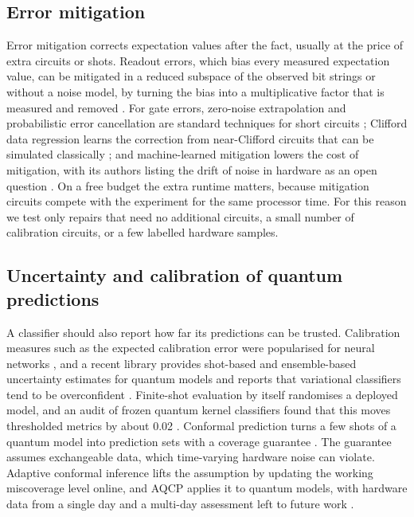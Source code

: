 \subsection{Error mitigation}
Error mitigation corrects expectation values after the fact, usually at the price of extra
circuits or shots. Readout errors, which bias every measured expectation value, can be mitigated
in a reduced subspace of the observed bit strings \cite{nation2021m3} or without a noise model,
by turning the bias into a multiplicative factor that is measured and removed
\cite{vandenberg2022trex}. For gate errors, zero-noise extrapolation and probabilistic error
cancellation are standard techniques for short circuits \cite{temme2017zne}; Clifford data
regression learns the correction from near-Clifford circuits that can be simulated classically
\cite{czarnik2021cdr}; and machine-learned mitigation lowers the cost of mitigation, with its
authors listing the drift of noise in hardware as an open question \cite{liao2024mlqem}. On a
free budget the extra runtime matters, because mitigation circuits compete with the experiment
for the same processor time. For this reason we test only repairs that need no additional
circuits, a small number of calibration circuits, or a few labelled hardware samples.

\subsection{Uncertainty and calibration of quantum predictions}
A classifier should also report how far its predictions can be trusted. Calibration measures such
as the expected calibration error were popularised for neural networks \cite{guo2017calibration},
and a recent library provides shot-based and ensemble-based uncertainty estimates for quantum
models and reports that variational classifiers tend to be overconfident \cite{quantumuq2026}.
Finite-shot evaluation by itself randomises a deployed model, and an audit of frozen quantum
kernel classifiers found that this moves thresholded metrics by about 0.02
\cite{fernandezbarrios2026conditional}. Conformal prediction turns a few shots of a quantum
model into prediction sets with a coverage guarantee \cite{park2023qcp}. The guarantee assumes
exchangeable data, which time-varying hardware noise can violate. Adaptive conformal inference
\cite{gibbs2021aci} lifts the assumption by updating the working miscoverage level online, and
AQCP applies it to quantum models, with hardware data from a single day and a multi-day
assessment left to future work \cite{spencer2026aqcp}.

